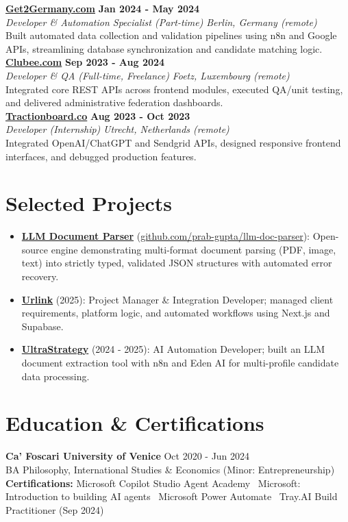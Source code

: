 \documentclass[a4paper,10pt]{article}
\newcommand{\role}[4]{%
  \textbf{#1} \hfill \textbf{#2}\\[1pt]%
  \textit{#3} \hfill \textit{#4}\\[2pt]%
}
\begin{document}
\role{\href{https://get2germany.com}{Get2Germany.com}}{Jan 2024 - May 2024}{Developer \& Automation Specialist (Part-time)}{Berlin, Germany (remote)}
Built automated data collection and validation pipelines using n8n and Google APIs, streamlining database synchronization and candidate matching logic.\\[1pt]

\role{\href{https://clubee.com}{Clubee.com}}{Sep 2023 - Aug 2024}{Developer \& QA (Full-time, Freelance)}{Foetz, Luxembourg (remote)}
Integrated core REST APIs across frontend modules, executed QA/unit testing, and delivered administrative federation dashboards.\\[1pt]

\role{\href{https://tractionboard.co}{Tractionboard.co}}{Aug 2023 - Oct 2023}{Developer (Internship)}{Utrecht, Netherlands (remote)}
Integrated OpenAI/ChatGPT and Sendgrid APIs, designed responsive frontend interfaces, and debugged production features.

\section{Selected Projects}
\begin{itemize}
  \item \textbf{\href{https://github.com/prab-gupta/llm-doc-parser}{LLM Document Parser}} (\href{https://github.com/prab-gupta/llm-doc-parser}{github.com/prab-gupta/llm-doc-parser}): Open-source engine demonstrating multi-format document parsing (PDF, image, text) into strictly typed, validated JSON structures with automated error recovery.
  \item \textbf{\href{https://smarturlink.com/}{Urlink}} (2025): Project Manager \& Integration Developer; managed client requirements, platform logic, and automated workflows using Next.js and Supabase.
  \item \textbf{\href{https://ultrastrategy.com}{UltraStrategy}} (2024 - 2025): AI Automation Developer; built an LLM document extraction tool with n8n and Eden AI for multi-profile candidate data processing.
\end{itemize}

\section{Education \& Certifications}
\textbf{Ca' Foscari University of Venice} \hfill Oct 2020 - Jun 2024\\
BA Philosophy, International Studies \& Economics (Minor: Entrepreneurship)\\[1pt]
\textbf{Certifications:} Microsoft Copilot Studio Agent Academy \textbullet\ Microsoft: Introduction to building AI agents \textbullet\ Microsoft Power Automate \textbullet\ Tray.AI Build Practitioner (Sep 2024)
\end{document}
